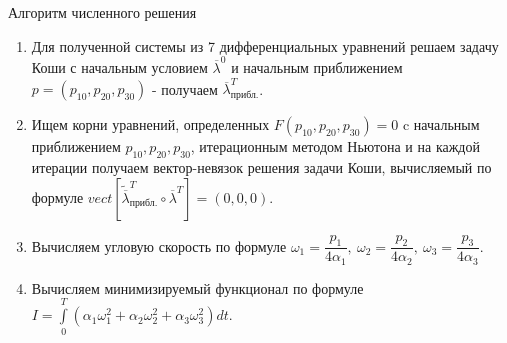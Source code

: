 \documentclass[10pt,utf8,presentation,notheorems,xcolor=dvipsnames,compress]{beamer}
\begin{document}
\begin{frame}[t]{Алгоритм численного решения} \vspace{4pt}
\begin{enumerate}
\item Для полученной системы из 7 дифференциальных уравнений решаем задачу Коши с начальным условием $\overline{\lambda}^{0}$ и начальным приближением $\textit{p} = (\textit{p}_{10}, \textit{p}_{20}, \textit{p}_{30})$ - получаем $\overline{\lambda}^{\textit{T}}_{\textit{прибл.}}$.

\item Ищем корни уравнений, определенных $\textit{F}(\textit{p}_{10}, \textit{p}_{20}, \textit{p}_{30}) = 0$ c начальным приближением $\textit{p}_{10}, \textit{p}_{20}, \textit{p}_{30}$, итерационным методом Ньютона и на каждой итерации получаем вектор-невязок решения задачи Коши, вычисляемый по формуле $\textit{vect}[\widetilde{\overline{\lambda}}^{\textit{T}}_{\textit{прибл.}} \circ \overline{\lambda}^{\textit{T}}] = (0, 0, 0)$.

\item Вычисляем угловую скорость по формуле $\omega_{1} = \dfrac{\textit{p}_{1}}{4\alpha_{1}},\ \omega_{2} = \dfrac{\textit{p}_{2}}{4\alpha_{2}},\ \omega_{3} = \dfrac{\textit{p}_{3}}{4\alpha_{3}}$.

\item Вычисляем минимизируемый функционал по формуле $\textit{I} = \int \limits_{0}^{\textit{T}} (\alpha_{1}\omega_{1}^{2}+\alpha_{2}\omega_{2}^{2}+\alpha_{3}\omega_{3}^{2}) \textit{dt}$.
\end{enumerate}
\end{frame}


\end{document}
